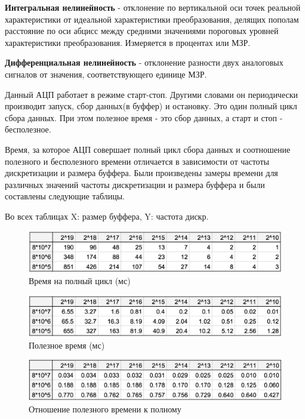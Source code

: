 \documentclass[14pt]{extarticle}
\begin{document}
\textbf{Интегральная нелинейность} - отклонение по вертикальной оси точек реальной характеристики от идеальной характеристики преобразования, делящих пополам расстояние по оси абцисс между средними значениями пороговых уровней характеристики преобразования. Измеряется в процентах или  МЗР.

\textbf{Дифференциальная нелинейность} - отклонение разности двух аналоговых сигналов от значения, соответствующего единице МЗР.

Данный АЦП работает в режиме старт-стоп. Другими словами он периодически производит запуск, сбор данных(в буффер) и остановку. Это один полный цикл сбора данных. При этом полезное время - это сбор данных, а старт и стоп - бесполезное.

Время, за которое АЦП совершает полный цикл сбора данных и соотношение полезного и бесполезного времени отличается в зависимости от частоты дискретизации и размера буффера. Были произведены замеры времени для различных значений частоты дискретизации и размера буффера и были составлены следующие таблицы.

Во всех таблицах X: размер буффера, Y: частота дискр.

\begin{figure}[H]
\centering
\includegraphics[width=\textwidth]{images/cycle-time.png}
\caption{Время на полный цикл (мс)}
\end{figure}

\begin{figure}[H]
\centering
\includegraphics[width=\textwidth]{images/good-time.png}
\caption{Полезное время (мс)}
\end{figure}

\begin{figure}[H]
\centering
\includegraphics[width=\textwidth]{images/bad-div-by-good.png}
\caption{Отношение полезного времени к полному}
\end{figure}
\end{document}
